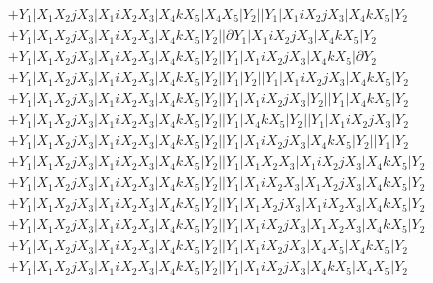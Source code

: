 \documentclass{article}[12pt]
\begin{document}
\begin{align*}
 & +Y_1|X_1X_2jX_3|X_1iX_2X_3|X_4kX_5|X_4X_5|Y_2||Y_1|X_1iX_2jX_3|X_4kX_5|Y_2\\ 
 & +Y_1|X_1X_2jX_3|X_1iX_2X_3|X_4kX_5|Y_2||\partial Y_1|X_1iX_2jX_3|X_4kX_5|Y_2\\ 
 & +Y_1|X_1X_2jX_3|X_1iX_2X_3|X_4kX_5|Y_2||Y_1|X_1iX_2jX_3|X_4kX_5|\partial Y_2\\ 
 & +Y_1|X_1X_2jX_3|X_1iX_2X_3|X_4kX_5|Y_2||Y_1|Y_2||Y_1|X_1iX_2jX_3|X_4kX_5|Y_2\\ 
 & +Y_1|X_1X_2jX_3|X_1iX_2X_3|X_4kX_5|Y_2||Y_1|X_1iX_2jX_3|Y_2||Y_1|X_4kX_5|Y_2\\ 
 & +Y_1|X_1X_2jX_3|X_1iX_2X_3|X_4kX_5|Y_2||Y_1|X_4kX_5|Y_2||Y_1|X_1iX_2jX_3|Y_2\\ 
 & +Y_1|X_1X_2jX_3|X_1iX_2X_3|X_4kX_5|Y_2||Y_1|X_1iX_2jX_3|X_4kX_5|Y_2||Y_1|Y_2\\ 
 & +Y_1|X_1X_2jX_3|X_1iX_2X_3|X_4kX_5|Y_2||Y_1|X_1X_2X_3|X_1iX_2jX_3|X_4kX_5|Y_2\\ 
 & +Y_1|X_1X_2jX_3|X_1iX_2X_3|X_4kX_5|Y_2||Y_1|X_1iX_2X_3|X_1X_2jX_3|X_4kX_5|Y_2\\ 
 & +Y_1|X_1X_2jX_3|X_1iX_2X_3|X_4kX_5|Y_2||Y_1|X_1X_2jX_3|X_1iX_2X_3|X_4kX_5|Y_2\\ 
 & +Y_1|X_1X_2jX_3|X_1iX_2X_3|X_4kX_5|Y_2||Y_1|X_1iX_2jX_3|X_1X_2X_3|X_4kX_5|Y_2\\ 
 & +Y_1|X_1X_2jX_3|X_1iX_2X_3|X_4kX_5|Y_2||Y_1|X_1iX_2jX_3|X_4X_5|X_4kX_5|Y_2\\ 
 & +Y_1|X_1X_2jX_3|X_1iX_2X_3|X_4kX_5|Y_2||Y_1|X_1iX_2jX_3|X_4kX_5|X_4X_5|Y_2\end{align*}
\end{document}
